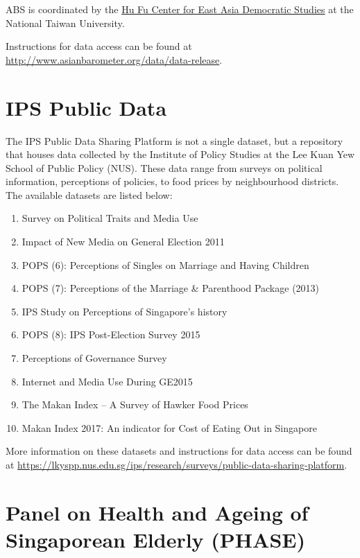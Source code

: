 \documentclass[openany]{book}
\providecommand{\tightlist}{%
  \setlength{\itemsep}{0pt}\setlength{\parskip}{0pt}}
\begin{document}
ABS is coordinated by the
\href{http://www.asianbarometer.org/structure}{Hu Fu Center for East
Asia Democratic Studies} at the National Taiwan University.

Instructions for data access can be found at
\url{http://www.asianbarometer.org/data/data-release}.

\section{IPS Public Data}\label{ips}

The IPS Public Data Sharing Platform is not a single dataset, but a
repository that houses data collected by the Institute of Policy Studies
at the Lee Kuan Yew School of Public Policy (NUS). These data range from
surveys on political information, perceptions of policies, to food
prices by neighbourhood districts. The available datasets are listed
below:

\begin{enumerate}
\def\labelenumi{\arabic{enumi})}
\tightlist
\item
  Survey on Political Traits and Media Use
\item
  Impact of New Media on General Election 2011
\item
  POPS (6): Perceptions of Singles on Marriage and Having Children
\item
  POPS (7): Perceptions of the Marriage \& Parenthood Package (2013)
\item
  IPS Study on Perceptions of Singapore's history
\item
  POPS (8): IPS Post-Election Survey 2015
\item
  Perceptions of Governance Survey
\item
  Internet and Media Use During GE2015
\item
  The Makan Index -- A Survey of Hawker Food Prices
\item
  Makan Index 2017: An indicator for Cost of Eating Out in Singapore
\end{enumerate}

More information on these datasets and instructions for data access can
be found at
\url{https://lkyspp.nus.edu.sg/ips/research/surveys/public-data-sharing-platform}.

\section{Panel on Health and Ageing of Singaporean Elderly
(PHASE)}\label{phase}
\end{document}
